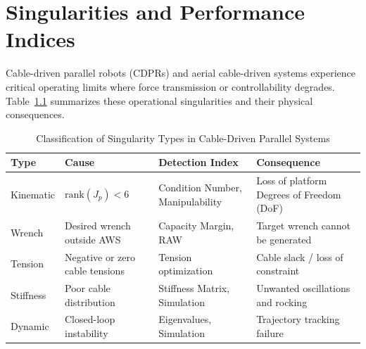 \chapter{Singularities and Performance Indices}
\label{chap:singularities}

Cable-driven parallel robots (CDPRs) and aerial cable-driven systems experience critical operating limits where force transmission or controllability degrades. Table~\ref{tab:singularity_classification} summarizes these operational singularities and their physical consequences.

\begin{table}[htbp]
\centering

\vspace{0.5em}
\begin{tabularx}{\textwidth}{l >{\raggedright\arraybackslash}X >{\raggedright\arraybackslash}X >{\raggedright\arraybackslash}X}
\toprule
\textbf{Type} & \textbf{Cause} & \textbf{Detection Index} & \textbf{Consequence} \\ 
\midrule
Kinematic & $\text{rank}(J_p) < 6$ & Condition Number, Manipulability & Loss of platform Degrees of Freedom (DoF) \\
Wrench    & Desired wrench outside AWS & Capacity Margin, RAW & Target wrench cannot be generated \\
Tension   & Negative or zero cable tensions & Tension optimization & Cable slack / loss of constraint \\
Stiffness & Poor cable distribution & Stiffness Matrix, Simulation & Unwanted oscillations and rocking \\
Dynamic   & Closed-loop instability & Eigenvalues, Simulation & Trajectory tracking failure \\
\bottomrule
\end{tabularx}
\caption{Classification of Singularity Types in Cable-Driven Parallel Systems}
\label{tab:singularity_classification}
\end{table}